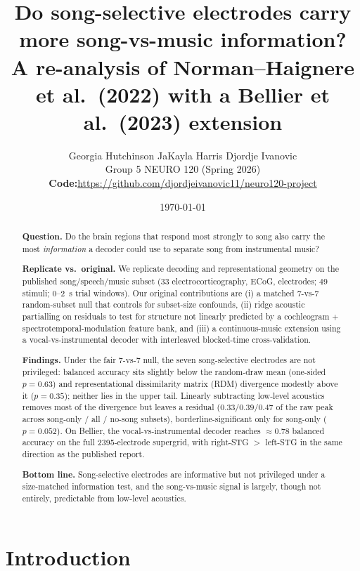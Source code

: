 \documentclass[11pt]{article}
\title{%
  \textbf{Do song-selective electrodes carry more song-vs-music information?}\protect\\[0.35em]
  {\large\textbf{A re-analysis of Norman--Haignere et al.\ (2022) with a Bellier et al.\ (2023) extension}}%
}
\author{%
  Georgia Hutchinson \quad JaKayla Harris \quad Djordje Ivanovic\\[0.35em]
  {\small Group 5 \;\textbar\; NEURO 120 (Spring 2026)}\\[0.55em]
  {\footnotesize\textbf{Code:}\quad\protect\url{https://github.com/djordjeivanovic11/neuro120-project}}%
}
\date{\today}
\begin{document}
\maketitle
\vspace{-1.75em}
\begin{abstract}
\noindent\textbf{Question.}\quad
Do the brain regions that respond most strongly to song also carry the most \emph{information} a decoder could use to separate song from instrumental music?

\smallskip
\noindent\textbf{Replicate vs.\ original.}\quad
We replicate decoding and representational geometry on the published \citet{NormanHaignere2022} song/speech/music subset (33 electrocorticography, ECoG, electrodes; 49 stimuli; 0--2~s trial windows). Our original contributions are (i) a matched 7-vs-7 random-subset null that controls for subset-size confounds, (ii) ridge acoustic partialling on residuals to test for structure not linearly predicted by a cochleogram + spectrotemporal-modulation feature bank, and (iii) a \citet{Bellier2023} continuous-music extension using a vocal-vs-instrumental decoder with interleaved blocked-time cross-validation.

\smallskip
\noindent\textbf{Findings.}\quad
Under the fair 7-vs-7 null, the seven song-selective electrodes are not privileged: balanced accuracy sits slightly below the random-draw mean (one-sided $p = 0.63$) and representational dissimilarity matrix (RDM) divergence modestly above it ($p = 0.35$); neither lies in the upper tail. Linearly subtracting low-level acoustics removes most of the divergence but leaves a residual ($0.33/0.39/0.47$ of the raw peak across song-only / all / no-song subsets), borderline-significant only for song-only ($p = 0.052$). On Bellier, the vocal-vs-instrumental decoder reaches $\approx 0.78$ balanced accuracy on the full 2395-electrode supergrid, with right-STG $>$ left-STG in the same direction as the published report.

\smallskip
\noindent\textbf{Bottom line.}\quad
Song-selective electrodes are informative but not privileged under a size-matched information test, and the song-vs-music signal is largely, though not entirely, predictable from low-level acoustics.
\end{abstract}

\section{Introduction}\label{sec:intro}
\end{document}
